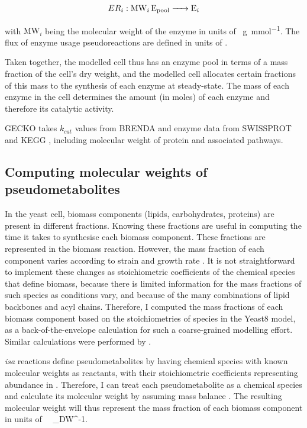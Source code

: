 \begin{equation}
  ER_{i}: \ce{ MW_{i} E_{\mathrm{pool}} -> E_{i} }
  \label{eq:model-gecko-enzyme-usage}
\end{equation}

with $\mathrm{MW}_{i}$ being the molecular weight of the enzyme in units of \SI{}{\gram~\milli\mole^{-1}}.
The flux of enzyme usage pseudoreactions are defined in units of \SI{}{\mmolgdw}.

Taken together, the modelled cell thus has an enzyme pool in terms of a mass fraction of the cell's dry weight, and the modelled cell allocates certain fractions of this mass to the synthesis of each enzyme at steady-state.  The mass of each enzyme in the cell determines the amount (in moles) of each enzyme and therefore its catalytic activity.

GECKO takes $k_{cat}$ values from BRENDA \parencite{changBRENDAELIXIRCore2021} and enzyme data from SWISSPROT \parencite{theuniprotconsortiumUniProtUniversalProtein2023} and KEGG \parencite{kanehisaKEGGTaxonomybasedAnalysis2023}, including molecular weight of protein and associated pathways.

\subsection{Computing molecular weights of pseudometabolites}
\label{subsec:model-yeast8-molweights}

In the yeast cell, biomass components (lipids, carbohydrates, proteins) are present in different fractions.
Knowing these fractions are useful in computing the time it takes to synthesise each biomass component.
These fractions are represented in the biomass reaction.
However, the mass fraction of each component varies according to strain and growth rate \parencite{nilssonMetabolicTradeoffsYeast2016, elsemmanWholecellModelingYeast2022}.
It is not straightforward to implement these changes as stoichiometric coefficients of the chemical species that define biomass, because there is limited information for the mass fractions of such species as conditions vary, and because of the many combinations of lipid backbones and acyl chains.
Therefore, I computed the mass fractions of each biomass component based on the stoichiometries of species in the Yeast8 model, as a back-of-the-envelope calculation for such a coarse-grained modelling effort.
Similar calculations were performed by \textcite{takhaveevTemporalSegregationBiosynthetic2023}.

\textit{isa} reactions define pseudometabolites by having chemical species with known molecular weights as reactants, with their stoichiometric coefficients representing abundance in \SI{}{\mmolgdw}.
Therefore, I can treat each pseudometabolite as a chemical species and calculate its molecular weight by assuming mass balance \parencite{chanStandardizingBiomassReactions2017, dinhQuantifyingPropagationParametric2022, takhaveevTemporalSegregationBiosynthetic2023}.
The resulting molecular weight will thus represent the mass fraction of each biomass component in units of \SI{}{\gram~\gram_{DW}^{-1}}.

